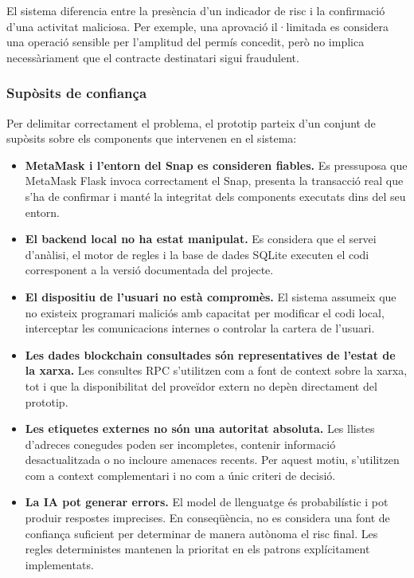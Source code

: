 El sistema diferencia entre la presència d’un indicador de risc i la confirmació d’una activitat maliciosa. Per exemple, una aprovació il·limitada es considera una operació sensible per l’amplitud del permís concedit, però no implica necessàriament que el contracte destinatari sigui fraudulent.

\subsubsection{Supòsits de confiança}

Per delimitar correctament el problema, el prototip parteix d’un conjunt de supòsits sobre els components que intervenen en el sistema:

\begin{itemize}
    \item \textbf{MetaMask i l’entorn del Snap es consideren fiables.} Es pressuposa que MetaMask Flask invoca correctament el Snap, presenta la transacció real que s’ha de confirmar i manté la integritat dels components executats dins del seu entorn.

    \item \textbf{El backend local no ha estat manipulat.} Es considera que el servei d’anàlisi, el motor de regles i la base de dades SQLite executen el codi corresponent a la versió documentada del projecte.

    \item \textbf{El dispositiu de l’usuari no està compromès.} El sistema assumeix que no existeix programari maliciós amb capacitat per modificar el codi local, interceptar les comunicacions internes o controlar la cartera de l’usuari.

    \item \textbf{Les dades blockchain consultades són representatives de l’estat de la xarxa.} Les consultes RPC s’utilitzen com a font de context sobre la xarxa, tot i que la disponibilitat del proveïdor extern no depèn directament del prototip.

    \item \textbf{Les etiquetes externes no són una autoritat absoluta.} Les llistes d’adreces conegudes poden ser incompletes, contenir informació desactualitzada o no incloure amenaces recents. Per aquest motiu, s’utilitzen com a context complementari i no com a únic criteri de decisió.

    \item \textbf{La IA pot generar errors.} El model de llenguatge és probabilístic i pot produir respostes imprecises. En conseqüència, no es considera una font de confiança suficient per determinar de manera autònoma el risc final. Les regles deterministes mantenen la prioritat en els patrons explícitament implementats.
\end{itemize}

